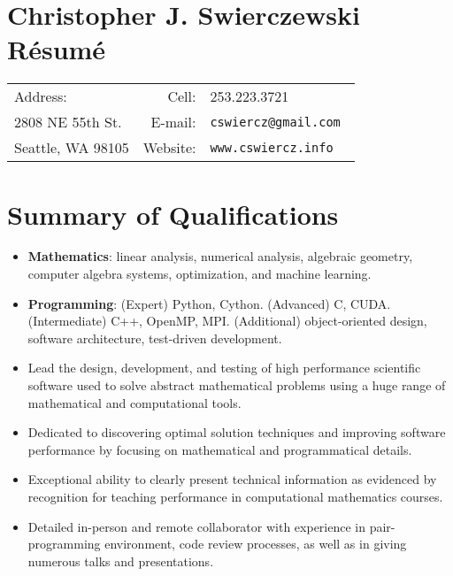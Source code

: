\documentclass{article}
\begin{document}
\section*{Christopher J. Swierczewski \hspace{5.9cm} R\'esum\'e}

\begin{tabular}{lrl}
  Address: \hspace{9cm}  & Cell:    & 253.223.3721 \\         
  2808 NE 55th St.       & E-mail:  & \tt cswiercz@gmail.com \\
  Seattle, WA 98105      & Website: & \tt www.cswiercz.info 
\end{tabular}

\section*{Summary of Qualifications}

\begin{itemize}
  \setlength{\itemsep}{0pt}
\item {\bf Mathematics}: linear analysis, numerical analysis, algebraic
  geometry, computer algebra systems, optimization, and machine learning.
\item {\bf Programming}: (Expert) Python, Cython. (Advanced) C, CUDA.
  (Intermediate) C++, OpenMP, MPI. (Additional) object-oriented design, software
  architecture, test-driven development.
\item Lead the design, development, and testing of high performance scientific
  software used to solve abstract mathematical problems using a huge range of
  mathematical and computational tools.
\item Dedicated to discovering optimal solution techniques and improving
  software performance by focusing on mathematical and programmatical details.
\item Exceptional ability to clearly present technical information as evidenced
  by recognition for teaching performance in computational mathematics courses.
\item Detailed in-person and remote collaborator with experience in
  pair-programming environment, code review processes, as well as in giving
  numerous talks and presentations.
\end{itemize}
\end{document}

